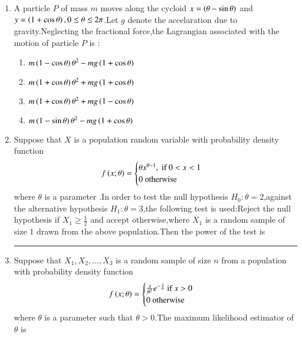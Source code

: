 \documentclass[journal,12pt,onecolumn]{IEEEtran}
\theoremstyle{remark}
\begin{document}
\begin{enumerate}
       \item A particle $P$ of mass $m$ moves along the cycloid $x = \left(\theta - \sin\theta\right)$ and $y = \left(1+\cos\theta\right) , 0 \leq \theta \leq 2\pi$.Let $g$ denote the accelaration due to gravity.Neglecting the fractional force,the Lagrangian associated with the motion of particle $P$ is :
       \begin{enumerate}
           \item $m\left(1-\cos\theta\right)\theta^{2} - mg\left(1+\cos\theta\right) $
           \item $m\left(1+\cos\theta\right)\theta^{2} + mg\left(1+\cos\theta\right) $
           \item $m\left(1+\cos\theta\right)\theta^{2} + mg\left(1-\cos\theta\right) $
           \item $m\left(1-\sin\theta\right)\theta^{2} - mg\left(1+\cos\theta\right) $\\
       \end{enumerate}
       \item Suppose that $X$ is a population random variable with probability density function
       \begin{align}
           f\left(x;\theta\right) = \begin{cases} \theta x^{\theta-1} , \text{ if } 0<x<1 \\ 0 \text{ otherwise } \end{cases}
       \end{align}
       where $\theta$ is a parameter .In order to test the null hypothesis $H_0 \colon \theta = 2$,against the alternative hypothesis $H_1 \colon \theta = 3$,the following test is used:Reject the null hypothesis if $X_1 \geq \frac{1}{2}$ and accept otherwise,where $X_1$ is a random sample of size $1$ drawn from the above population.Then the power of the test is \rule{3cm}{0.15 mm}
       \item Suppose that $X_1,X_2,\dots,X_3$ is a random sample of size $n$ from a population with probability density function
       \begin{align}
           f\left(x;\theta\right) = \begin{cases}
               \frac{x}{\theta^2}e^{-\frac{x}{\theta}} \text{ if } x>0 \\ 0 \text{ otherwise }
           \end{cases}
       \end{align}
       where $\theta$ is a parameter such that $\theta > 0$.The maximum likelihood estimator of $\theta $ is
       \begin{multicols}{2}
       \begin{enumerate}

\end{enumerate}
\end{multicols}
\end{enumerate}
\end{document}
